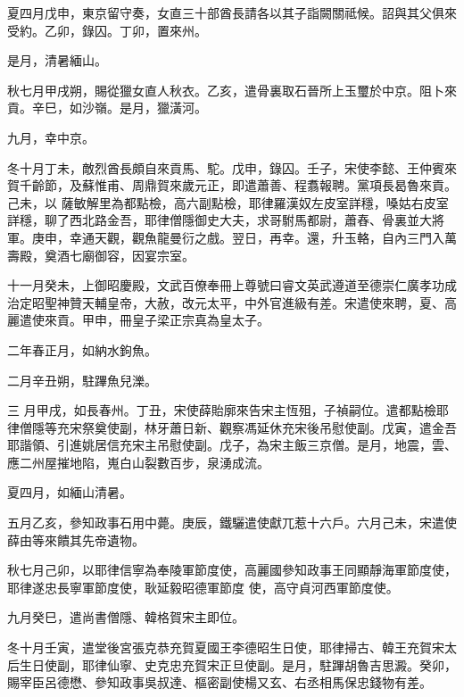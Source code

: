 \begin{pinyinscope}
 夏四月戊申，東京留守奏，女直三十部酋長請各以其子詣闕關祗候。詔與其父俱來受約。乙卯，錄囚。丁卯，置來州。



 是月，清暑緬山。



 秋七月甲戌朔，賜從獵女直人秋衣。乙亥，遣骨裏取石晉所上玉璽於中京。阻卜來貢。辛巳，如沙嶺。是月，獵潢河。



 九月，幸中京。



 冬十月丁未，敵烈酋長頗自來貢馬、駝。戊申，錄囚。壬子，宋使李懿、王仲賓來賀千齡節，及蘇惟甫、周鼎賀來歲元正，即遣蕭善、程翥報聘。黨項長曷魯來貢。己未，以
 薩敏解里為都點檢，高六副點檢，耶律羅漢奴左皮室詳穩，嗓姑右皮室詳穩，聊了西北路金吾，耶律僧隱御史大夫，求哥駙馬都尉，蕭舂、骨裏並大將軍。庚申，幸通天觀，觀魚龍曼衍之戲。翌日，再幸。還，升玉輅，自內三門入萬壽殿，奠酒七廟御容，因宴宗室。



 十一月癸未，上御昭慶殿，文武百僚奉冊上尊號曰睿文英武遵道至德崇仁廣孝功成治定昭聖神贊天輔皇帝，大赦，改元太平，中外官進級有差。宋遣使來聘，夏、高麗遣使來貢。甲申，冊皇子梁正宗真為皇太子。



 二年春正月，如納水鉤魚。



 二月辛丑朔，駐蹕魚兒濼。



 三
 月甲戌，如長春州。丁丑，宋使薛貽廓來告宋主恆殂，子禎嗣位。遣都點檢耶律僧隱等充宋祭奠使副，林牙蕭日新、觀察馮延休充宋後吊慰使副。戊寅，遣金吾耶諧領、引進姚居信充宋主吊慰使副。戊子，為宋主飯三京僧。是月，地震，雲、應二州屋摧地陷，嵬白山裂數百步，泉湧成流。



 夏四月，如緬山清暑。



 五月乙亥，參知政事石用中薨。庚辰，鐵驪遣使獻兀惹十六戶。六月己未，宋遣使薛由等來饋其先帝遺物。



 秋七月己卯，以耶律信寧為奉陵軍節度使，高麗國參知政事王同顯靜海軍節度使，耶律遂忠長寧軍節度使，耿延毅昭德軍節度
 使，高守貞河西軍節度使。



 九月癸巳，遣尚書僧隱、韓格賀宋主即位。



 冬十月壬寅，遣堂後宮張克恭充賀夏國王李德昭生日使，耶律掃古、韓王充賀宋太后生日使副，耶律仙寧、史克忠充賀宋正旦使副。是月，駐蹕胡魯吉思澱。癸卯，賜宰臣呂德懋、參知政事吳叔達、樞密副使楊又玄、右丞相馬保忠錢物有差。




\end{pinyinscope}
